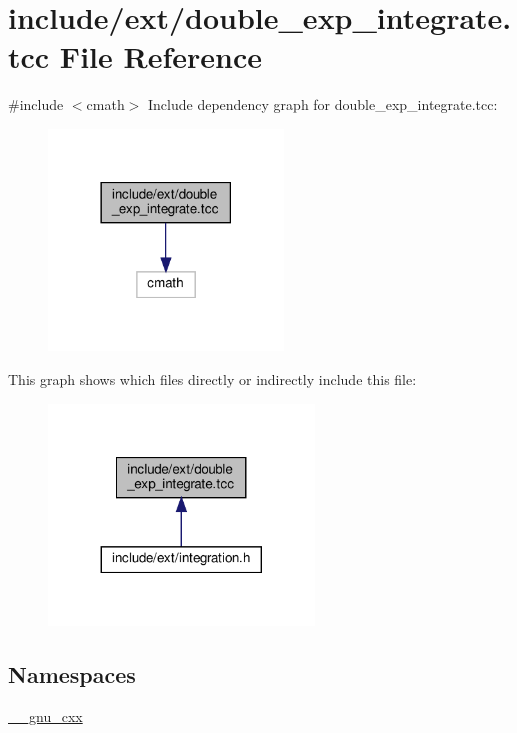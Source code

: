 \hypertarget{double__exp__integrate_8tcc}{}\section{include/ext/double\+\_\+exp\+\_\+integrate.tcc File Reference}
\label{double__exp__integrate_8tcc}
{\ttfamily \#include $<$cmath$>$}\newline
Include dependency graph for double\+\_\+exp\+\_\+integrate.\+tcc\+:
\nopagebreak
\begin{figure}[H]
\begin{center}
\leavevmode
\includegraphics[width=177pt]{double__exp__integrate_8tcc__incl}
\end{center}
\end{figure}
This graph shows which files directly or indirectly include this file\+:
\nopagebreak
\begin{figure}[H]
\begin{center}
\leavevmode
\includegraphics[width=200pt]{double__exp__integrate_8tcc__dep__incl}
\end{center}
\end{figure}
\subsection*{Namespaces}
\begin{DoxyCompactItemize}
\item 
 \hyperlink{namespace____gnu__cxx}{\+\_\+\+\_\+gnu\+\_\+cxx}
\end{DoxyCompactItemize}
